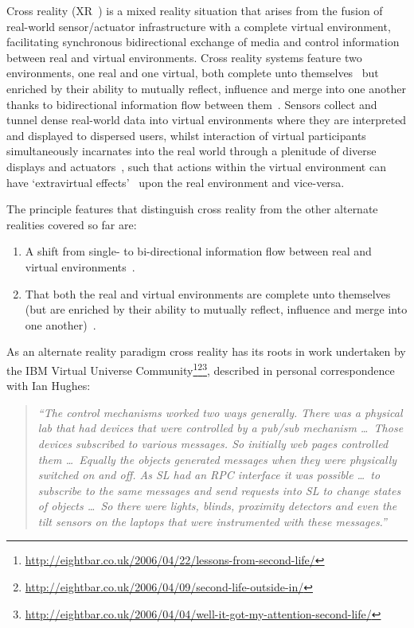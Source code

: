 Cross reality (XR~\cite{kim:practical}) is a mixed reality situation that arises from the fusion of real-world sensor/actuator infrastructure with a complete virtual environment, facilitating synchronous bidirectional exchange of media and control information between real and virtual environments. Cross reality systems feature two environments, one real and one virtual, both complete unto themselves~\cite{lifton:merging} but enriched by their ability to mutually reflect, influence and merge into one another thanks to bidirectional information flow between them~\cite{kim:practical}. Sensors collect and tunnel dense real-world data into virtual environments where they are interpreted and displayed to dispersed users, whilst interaction of virtual participants simultaneously incarnates into the real world through a plenitude of diverse displays and actuators~\cite{Paradiso2009}, such that actions within the virtual environment can have `extravirtual effects'~\cite{Soraker2010} upon the real environment and vice-versa.

The principle features that distinguish cross reality from the other alternate realities covered so far are:
\begin{enumerate}
	\item A shift from single- to bi-directional information flow between real and virtual environments~\cite{kim:practical}.
	\item That both the real and virtual environments are complete unto themselves (but are enriched by their ability to mutually reflect, influence and merge into one another)~\cite{lifton:merging}.
\end{enumerate}

As an alternate reality paradigm cross reality has its roots in work undertaken by the IBM Virtual Universe Community\footnote{\url{http://eightbar.co.uk/2006/04/22/lessons-from-second-life/}}\footnote{\url{http://eightbar.co.uk/2006/04/09/second-life-outside-in/}}\footnote{\url{http://eightbar.co.uk/2006/04/04/well-it-got-my-attention-second-life/}}, described in personal correspondence with Ian Hughes:

\begin{quote}
\textit{``The control mechanisms worked two ways generally. There was a physical lab that had devices that were controlled by a pub/sub mechanism \ldots\ Those devices subscribed to various messages. So initially web pages controlled them \ldots\ Equally the objects generated messages when they were physically switched on and off. As SL\SLfootnote{} had an RPC interface it was possible \ldots\ to subscribe to the same messages and send requests into SL to change states of objects \ldots\ So there were lights, blinds, proximity detectors and even the tilt sensors on the laptops that were instrumented with these messages.''}
\end{quote}

